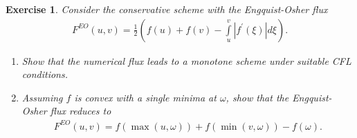 \documentclass[10pt,letterpaper]{article}
\newcommand{\rb}[1]{ \left(  {#1} \right) }
\theoremstyle{break}
\newtheorem{exercise}{Exercise}
\begin{document}
\begin{exercise}
	Consider the conservative scheme with the \textit{Engquist-Osher} flux
	\begin{gather}
	F^{EO}(u,v) = \frac{1}{2} \rb{ f(u) + f(v) - \int \limits_u^v |f^\prime(\xi)|  d\xi}.
	\end{gather}
	\begin{enumerate}
	\item Show that the numerical flux leads to a monotone scheme under suitable CFL conditions.

	\item Assuming $f$ is convex with a single minima at $\omega$, show that the Engquist-Osher flux reduces to
	\begin{gather}
	F^{EO}(u,v) = f(\max(u,\omega)) + f(\min(v,\omega)) - f(\omega).
	\end{gather}
	\end{enumerate}
\end{exercise}
\end{document}
